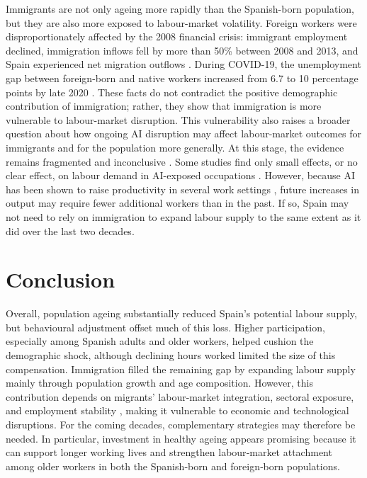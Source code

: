 Immigrants are not only ageing more rapidly than the Spanish-born population, but they are also more exposed to labour-market volatility. Foreign workers were disproportionately affected by the 2008 financial crisis: immigrant employment declined, immigration inflows fell by more than 50\% between 2008 and 2013, and Spain experienced net migration outflows \parencite{rodriguez2016labor}. During COVID-19, the unemployment gap between foreign-born and native workers increased from 6.7 to 10 percentage points by late 2020 \parencite{centaur2021,fasani2023,lacaixa2021}. These facts do not contradict the positive demographic contribution of immigration; rather, they show that immigration is more vulnerable to labour-market disruption. This vulnerability also raises a broader question about how ongoing AI disruption may affect labour-market outcomes for immigrants and for the population more generally. At this stage, the evidence remains fragmented and inconclusive \parencite{pizzinelli2023aiExposure}. Some studies find only small effects, or no clear effect, on labour demand in AI-exposed occupations \parencite{hartley2024labor,Ghosh2025AIExposure}. However, because AI has been shown to raise productivity in several work settings \parencite{DellAcqua2024AIProductivity,Noy2023ProductivityAI}, future increases in output may require fewer additional workers than in the past. If so, Spain may not need to rely on immigration to expand labour supply to the same extent as it did over the last two decades.


\section{Conclusion}

Overall, population ageing substantially reduced Spain's potential labour supply, but behavioural adjustment offset much of this loss. Higher participation, especially among Spanish adults and older workers, helped cushion the demographic shock, although declining hours worked limited the size of this compensation. Immigration filled the remaining gap by expanding labour supply mainly through population growth and age composition. However, this contribution depends on migrants' labour-market integration, sectoral exposure, and employment stability \parencite{preston2014effect,fiorio2023migration,naumann2021population}, making it vulnerable to economic and technological disruptions. For the coming decades, complementary strategies may therefore be needed. In particular, investment in healthy ageing appears promising because it can support longer working lives and strengthen labour‑market attachment among older workers in both the Spanish‑born and foreign‑born populations.